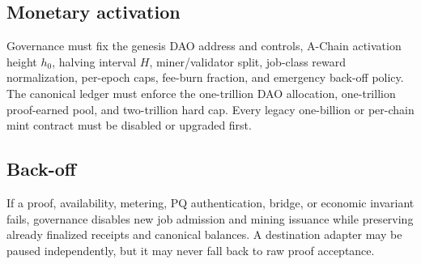 \subsection{Monetary activation}

Governance must fix the genesis DAO address and controls, A-Chain activation
height $h_0$, halving interval $H$, miner/validator split, job-class reward
normalization, per-epoch caps, fee-burn fraction, and emergency back-off policy.
The canonical ledger must enforce the one-trillion DAO allocation, one-trillion
proof-earned pool, and two-trillion hard cap. Every legacy one-billion or
per-chain mint contract must be disabled or upgraded first.

\subsection{Back-off}

If a proof, availability, metering, PQ authentication, bridge, or economic
invariant fails, governance disables new job admission and mining issuance while
preserving already finalized receipts and canonical balances. A destination
adapter may be paused independently, but it may never fall back to raw proof
acceptance.
